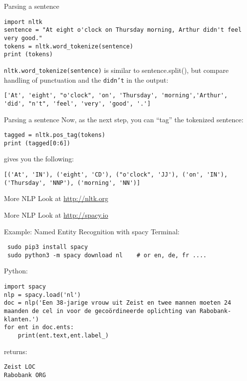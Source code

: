 \documentclass{beamer}
\begin{document}
\begin{frame}[fragile]{Parsing a sentence}
\begin{lstlisting}
import nltk
sentence = "At eight o'clock on Thursday morning, Arthur didn't feel very good."
tokens = nltk.word_tokenize(sentence)
print (tokens)
\end{lstlisting}

\texttt{nltk.word\_tokenize(sentence)} is similar to sentence.split(), but compare handling of punctuation and the \texttt{didn't} in the output:
\begin{lstlisting}
['At', 'eight', "o'clock", 'on', 'Thursday', 'morning','Arthur', 'did', "n't", 'feel', 'very', 'good', '.']
\end{lstlisting}
\end{frame}


\begin{frame}[fragile]{Parsing a sentence}
Now, as the next step, you can ``tag'' the tokenized sentence:
\begin{lstlisting}
tagged = nltk.pos_tag(tokens)
print (tagged[0:6])
\end{lstlisting}
gives you the following:
\begin{lstlisting}
[('At', 'IN'), ('eight', 'CD'), ("o'clock", 'JJ'), ('on', 'IN'),
('Thursday', 'NNP'), ('morning', 'NN')]
\end{lstlisting}


\end{frame}


\begin{frame}{More NLP}
\Huge{Look at \url{http://nltk.org}}

\end{frame}


\begin{frame}{More NLP}
\Huge{Look at \url{http://spacy.io}}
\end{frame}


\begin{frame}[fragile]{Example: Named Entity Recognition with spacy}
Terminal:

\begin{lstlisting}
 sudo pip3 install spacy
 sudo python3 -m spacy download nl    # or en, de, fr ....
\end{lstlisting}

Python:

\begin{lstlisting}
import spacy
nlp = spacy.load('nl')
doc = nlp('Een 38-jarige vrouw uit Zeist en twee mannen moeten 24 maanden de cel in voor de gecoördineerde oplichting van Rabobank-klanten.')
for ent in doc.ents:
    print(ent.text,ent.label_)
\end{lstlisting}

returns:

\begin{lstlisting}
Zeist LOC
Rabobank ORG
\end{lstlisting}  

\end{frame}
\end{document}
